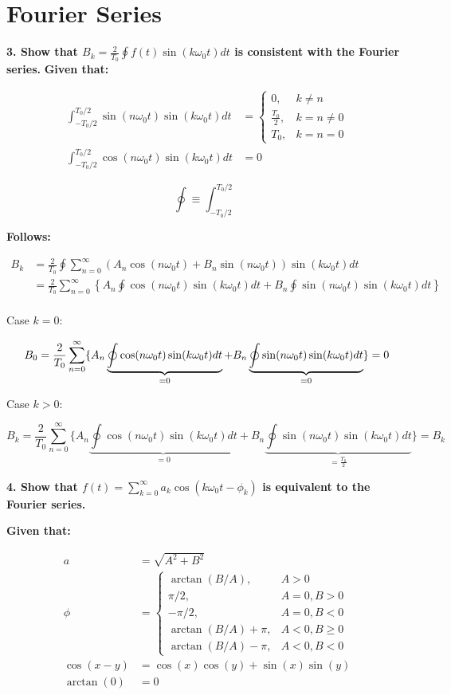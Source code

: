 \section*{Fourier Series}
\textbf{3. Show that $B_k = \frac{2}{T_0} \oint f(t) \sin(k \omega_0 t) dt$ is consistent with the Fourier series.}
\textbf{Given that:}

\begin{align}
	\int_{-T_0/2}^{T_0/2} \sin(n \omega_0 t) \sin(k \omega_0 t) dt &=
	\begin{cases}
		0,& k \neq n\\
		\frac{T_0}{2},& k = n \neq 0\\
		T_0,& k = n = 0
	\end{cases}
	\\
	\int_{-T_0/2}^{T_0/2} \cos(n \omega_0 t) \sin(k \omega_0 t) dt &= 0 
\end{align}

\begin{equation}
	\oint \equiv \int_{-T_0/2}^{T_0/2}
\end{equation}

\textbf{Follows:}

\begin{align*}
	B_k &= \frac{2}{T_0} \oint \sum_{n=0}^\infty \left(A_n \cos(n \omega_0 t) + B_n \sin(n \omega_0 t) \right) \sin(k \omega_0 t) dt \\
	&= \frac{2}{T_0} \sum_{n=0}^\infty \left\{A_n \oint \cos(n \omega_0 t) \sin(k \omega_0 t) dt + B_n \oint \sin(n \omega_0 t) \sin(k \omega_0 t) dt \right\} \\
\end{align*}

Case $k = 0$:

\[
	B_0 = \frac{2}{T_0} \sum_{n=0}^\infty \{A_n \underbrace{\oint \cos(n \omega_0 t) \sin(k \omega_0 t) dt}_{=0} + B_n \underbrace{\oint \sin(n \omega_0 t) \sin(k \omega_0 t) dt}_{=0} \} = 0\\
\]

Case $k > 0$:

\[
	B_k = \frac{2}{T_0} \sum_{n=0}^\infty \{A_n \underbrace{\oint \cos(n \omega_0 t) \sin(k \omega_0 t) dt}_{=0} + B_n \underbrace{\oint \sin(n \omega_0 t) \sin(k \omega_0 t) dt}_{=\frac{T_0}{2}} \} = B_k
\]

\textbf{4. Show that $f(t) = \sum_{k=0}^\infty a_k \cos(k \omega_0 t - \phi_k)$ is equivalent to the Fourier series.}

\textbf{Given that:}

\begin{align}
	a &= \sqrt{A^2 + B^2} \\
	\phi &= 
	\begin{cases}
		\arctan(B/A), & A > 0\\
		\pi/2, & A=0, B>0\\
		-\pi/2, & A=0, B<0\\
		\arctan(B/A)+\pi, & A<0, B \geq 0\\
		\arctan(B/A)-\pi, & A<0, B < 0
	\end{cases}
	\\
	\cos(x-y) &= \cos(x)\cos(y) + \sin(x)\sin(y)\\
	\arctan(0) &= 0
\end{align}

